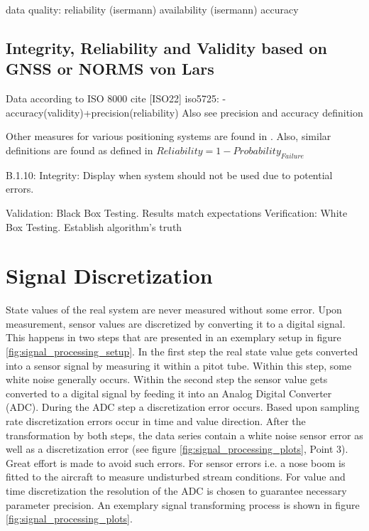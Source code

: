 data quality:
reliability (isermann)
availability (isermann)
accuracy

\subsection{Integrity, Reliability and Validity based on GNSS or NORMS von Lars}
Data according to ISO 8000 cite [ISO22]
iso5725:
-accuracy(validity)+precision(reliability)
Also see precision and accuracy definition \cite[S.33ff.]{smith_scientist_nodate}



Other measures for various positioning systems are found in \textcite{faa_federal_radionavigation_plan_2008}. Also, similar definitions are found as defined in \textcite{isermann_fault-diagnosis_2011}
$Reliability = 1-Probability_{Failure}$
\cite[B.1.5]{faa_federal_radionavigation_plan_2008}

B.1.10: Integrity: Display when system should not be used due to potential errors.

Validation: Black Box Testing. Results match expectations
Verification: White Box Testing. Establish algorithm's truth


\section{Signal Discretization}

State values of the real system are never measured without some error. Upon measurement, sensor values are discretized by converting it to a digital signal. This happens in two steps that are presented in an exemplary setup in figure \ref{fig:signal_processing_setup}. In the first step the real state value gets converted into a sensor signal by measuring it within a pitot tube. Within this step, some white noise generally occurs. Within the second step the sensor value gets converted to a digital signal by feeding it into an Analog Digital Converter (ADC). During the ADC step a discretization error occurs. Based upon sampling rate discretization errors occur in time and value direction. After the transformation by both steps, the data series contain a white noise sensor error as well as a discretization error (see figure \ref{fig:signal_processing_plots}, Point 3). Great effort is made to avoid such errors. For sensor errors i.e. a nose boom is fitted to the aircraft to measure undisturbed stream conditions. For value and time discretization the resolution of the ADC is chosen to guarantee necessary parameter precision. An exemplary signal transforming process is shown in figure \ref{fig:signal_processing_plots}.

